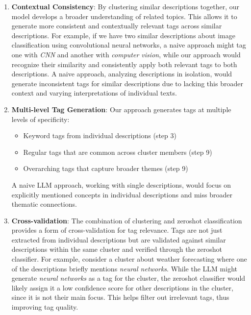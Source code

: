 \begin{enumerate}
    \item \textbf{Contextual Consistency}: By clustering similar descriptions together, our model develops a broader understanding of related topics. This allows it to generate more consistent and contextually relevant tags across similar descriptions. For example, if we have two similar descriptions about image classification using convolutional neural networks, a naive approach might tag one with \textit{CNN} and another with \textit{computer vision}, while our approach would recognize their similarity and consistently apply both relevant tags to both descriptions. A naive approach, analyzing descriptions in isolation, would generate inconsistent tags for similar descriptions due to lacking this broader context and varying interpretations of individual texts.
    
    \item \textbf{Multi-level Tag Generation}: Our approach generates tags at multiple levels of specificity:
    \begin{itemize}
        \item Keyword tags from individual descriptions (step 3)
        \item Regular tags that are common across cluster members (step 9)
        \item Overarching tags that capture broader themes (step 9)
    \end{itemize}
    A naive LLM approach, working with single descriptions, would focus on explicitly mentioned concepts in individual descriptions and miss broader thematic connections.
    
    \item \textbf{Cross-validation}: The combination of clustering and zeroshot classification provides a form of cross-validation for tag relevance. Tags are not just extracted from individual descriptions but are validated against similar descriptions within the same cluster and verified through the zeroshot classifier. For example, consider a cluster about weather forecasting where one of the descriptions briefly mentions \textit{neural networks}. While the LLM might generate \textit{neural networks} as a tag for the cluster, the zeroshot classifier would likely assign it a low confidence score for other descriptions in the cluster, since it is not their main focus. This helps filter out irrelevant tags, thus improving tag quality. 
    

\end{enumerate}
